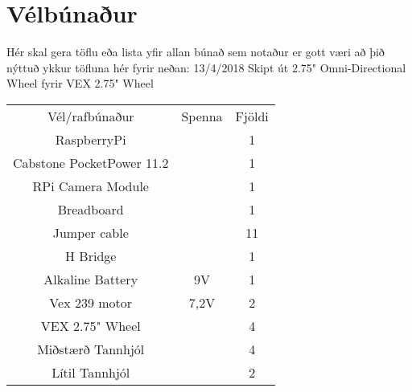\section{Vélbúnaður}
Hér skal gera töflu eða lista yfir allan búnað sem notaður er gott væri að þið nýttuð ykkur töfluna hér fyrir neðan:
13/4/2018 Skipt út  2.75" Omni-Directional Wheel fyrir VEX 2.75" Wheel

\begin{center}
\begin{tabular}{ |c|c|c| } 
 \hline
 Vél/rafbúnaður &Spenna &Fjöldi\\ 
 RaspberryPi & & 1 \\ 
Cabstone PocketPower 11.2 & & 1\\
 RPi Camera Module & & 1 \\
 Breadboard & & 1 \\
 Jumper cable & & 11 \\
 H Bridge & & 1 \\
 Alkaline Battery & 9V & 1 \\
 Vex 239 motor & 7,2V & 2 \\
 VEX 2.75" Wheel & & 4 \\
 Miðstærð Tannhjól & & 4 \\
 Lítil Tannhjól & & 2 \\
 \hline
\end{tabular}
\end{center}